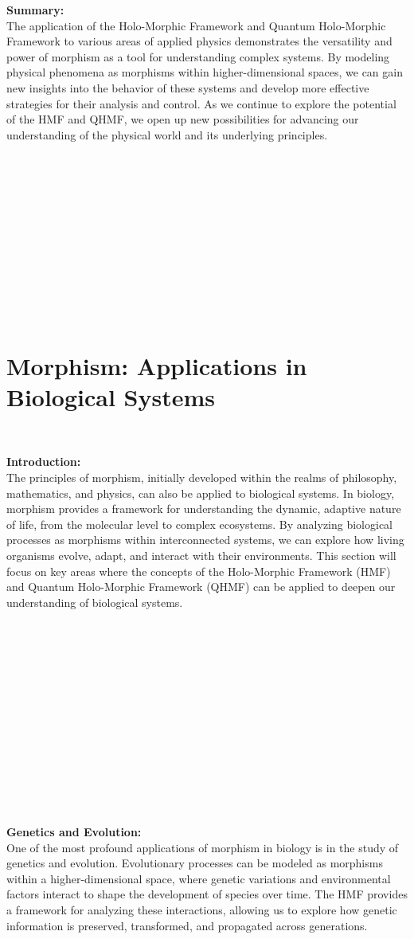 \documentclass{article}
\begin{document}
\textbf{Summary:}
\\

The application of the Holo-Morphic Framework and Quantum Holo-Morphic Framework to various areas of applied physics demonstrates the versatility and power of morphism as a tool for understanding complex systems. By modeling physical phenomena as morphisms within higher-dimensional spaces, we can gain new insights into the behavior of these systems and develop more effective strategies for their analysis and control. As we continue to explore the potential of the HMF and QHMF, we open up new possibilities for advancing our understanding of the physical world and its underlying principles.
\\
\

\

\

\

\

\

\
\section*{Morphism: Applications in Biological Systems}
\

\textbf{Introduction:}
\\

The principles of morphism, initially developed within the realms of philosophy, mathematics, and physics, can also be applied to biological systems. In biology, morphism provides a framework for understanding the dynamic, adaptive nature of life, from the molecular level to complex ecosystems. By analyzing biological processes as morphisms within interconnected systems, we can explore how living organisms evolve, adapt, and interact with their environments. This section will focus on key areas where the concepts of the Holo-Morphic Framework (HMF) and Quantum Holo-Morphic Framework (QHMF) can be applied to deepen our understanding of biological systems.
\\

\

\

\

\

\

\

\

\

\textbf{Genetics and Evolution:}
\\

One of the most profound applications of morphism in biology is in the study of genetics and evolution. Evolutionary processes can be modeled as morphisms within a higher-dimensional space, where genetic variations and environmental factors interact to shape the development of species over time. The HMF provides a framework for analyzing these interactions, allowing us to explore how genetic information is preserved, transformed, and propagated across generations.
\end{document}
